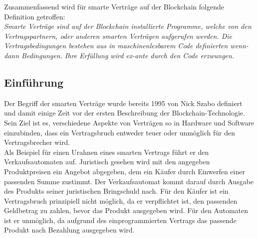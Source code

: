 Zusammenfassend wird für smarte Verträge auf der Blockchain folgende Definition getroffen:\\
\textit{\glqq Smarte Verträge sind auf der Blockchain installierte Programme, welche von den Vertragspartnern, oder anderen smarten Verträgen aufgerufen werden. Die Vertragsbedingungen bestehen aus in maschinenlesbarem Code definierten wenn-dann Bedingungen. Ihre Erfüllung wird ex-ante durch den Code erzwungen.\grqq{}}

\subsection{Einführung}

Der Begriff der smarten Verträge wurde bereits 1995 von Nick Szabo definiert und damit einige Zeit vor der ersten Beschreibung der Blockchain-Technologie. Sein Ziel ist es, verschiedene Aspekte von Verträgen so in Hardware und Software einzubinden, dass ein Vertragsbruch entweder teuer oder unmöglich für den Vertragsbrecher wird. \\
Als Beispiel für einen \glqq Urahnen\grqq{} eines smarten Vertrags führt er den Verkaufsautomaten auf. Juristisch gesehen wird mit den angegeben Produktpreisen ein Angebot abgegeben, dem ein Käufer durch Einwerfen einer passenden Summe zustimmt. Der Verkaufsautomat kommt darauf durch Ausgabe des Produkts seiner juristischen Bringschuld nach. Für den Käufer ist ein Vertragsbruch prinzipiell nicht möglich, da er verpflichtet ist, den passenden Geldbetrag zu zahlen, bevor das Produkt ausgegeben wird. Für den Automaten ist er unmöglich, da aufgrund des einprogrammierten Vertrags das passende Produkt nach Bezahlung ausgegeben wird. %
\textit{\cite{Szabo.1997}} \\

